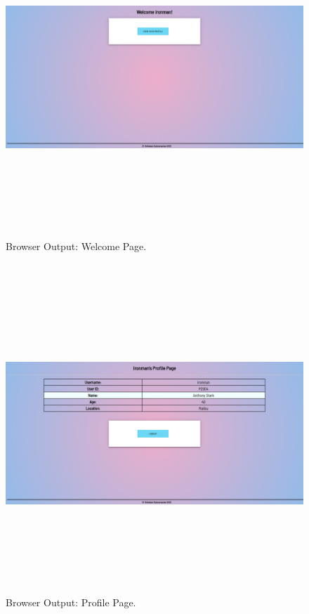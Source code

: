 \documentclass[12pt, a4]{article}
\begin{document}
\subsection*{}
\begin{figure}[h]
\centering
\caption{Browser Output: Welcome Page.}
\includegraphics[height=12cm, width=18cm]{Output/Welcome.png}
\end{figure}

\newpage
\subsection*{}
\begin{figure}[h]
\centering
\caption{Browser Output: Profile Page.}
\includegraphics[height=12cm, width=18cm]{Output/Profile.png}
\end{figure}
\end{document}
